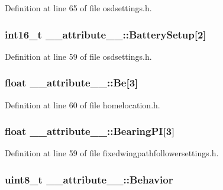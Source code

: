 \-Definition at line 65 of file osdsettings.\-h.

\hypertarget{struct____attribute_____ac7962e10d6f6f3834a12c5cd7934d60d}{
\subsubsection[{\-Battery\-Setup}]{\setlength{\rightskip}{0pt plus 5cm}int16\-\_\-t {\bf \-\_\-\-\_\-attribute\-\_\-\-\_\-\-::\-Battery\-Setup}\mbox{[}2\mbox{]}}}\label{struct____attribute_____ac7962e10d6f6f3834a12c5cd7934d60d}


\-Definition at line 59 of file osdsettings.\-h.

\hypertarget{struct____attribute_____ab887c9b6aa59638e83e79afd7379ce48}{
\subsubsection[{\-Be}]{\setlength{\rightskip}{0pt plus 5cm}float {\bf \-\_\-\-\_\-attribute\-\_\-\-\_\-\-::\-Be}\mbox{[}3\mbox{]}}}\label{struct____attribute_____ab887c9b6aa59638e83e79afd7379ce48}


\-Definition at line 60 of file homelocation.\-h.

\hypertarget{struct____attribute_____a2edc0af8e86ce9634547ae9fc99f3dea}{
\subsubsection[{\-Bearing\-P\-I}]{\setlength{\rightskip}{0pt plus 5cm}float {\bf \-\_\-\-\_\-attribute\-\_\-\-\_\-\-::\-Bearing\-P\-I}\mbox{[}3\mbox{]}}}\label{struct____attribute_____a2edc0af8e86ce9634547ae9fc99f3dea}


\-Definition at line 59 of file fixedwingpathfollowersettings.\-h.

\hypertarget{struct____attribute_____a55704f82c5bf39f1d0ddddb0f170cecb}{
\subsubsection[{\-Behavior}]{\setlength{\rightskip}{0pt plus 5cm}uint8\-\_\-t {\bf \-\_\-\-\_\-attribute\-\_\-\-\_\-\-::\-Behavior}}}\label{struct____attribute_____a55704f82c5bf39f1d0ddddb0f170cecb}


